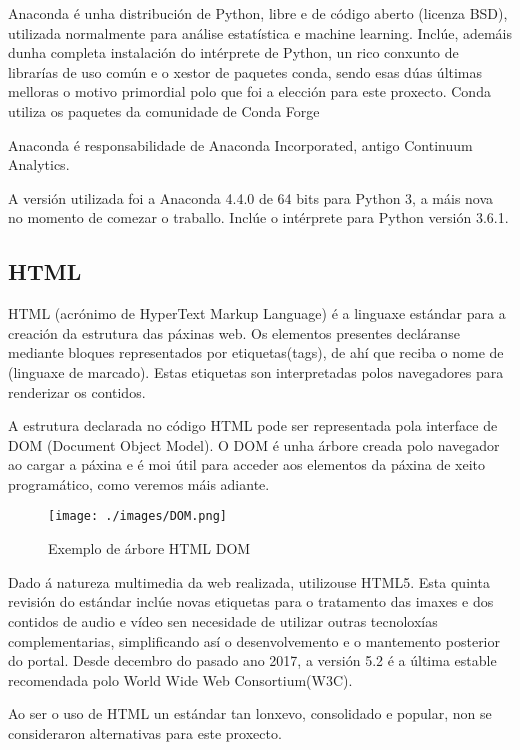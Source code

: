 Anaconda é unha distribución de Python, libre e de código aberto (licenza BSD), utilizada normalmente para análise estatística e machine learning. Inclúe, ademáis dunha completa instalación do intérprete de Python, un rico conxunto de librarías de uso común e o xestor de paquetes conda, sendo esas dúas últimas melloras o motivo primordial polo que foi a elección para este proxecto. Conda utiliza os paquetes da comunidade de Conda Forge \cite{anaconda1}

Anaconda é responsabilidade de Anaconda Incorporated, antigo Continuum Analytics.

A versión utilizada foi a Anaconda 4.4.0 de 64 bits para Python 3, a máis nova no momento de comezar o traballo. Inclúe o intérprete para Python versión 3.6.1.


\subsection{HTML}

HTML (acrónimo de HyperText Markup Language) é a linguaxe estándar para a creación da estrutura das páxinas web. Os 
elementos presentes decláranse mediante bloques representados por etiquetas(tags), de ahí que reciba o nome de
 (linguaxe de marcado). Estas etiquetas son interpretadas polos navegadores para renderizar os 
contidos\cite{html1}. 

A estrutura declarada no código HTML pode ser representada pola interface de DOM (Document Object Model). O DOM é unha árbore creada polo navegador ao cargar a páxina e é moi útil para acceder aos elementos da páxina de xeito programático, como veremos máis adiante.

\begin{figure}[H]
	\centering
	\texttt{[image: ./images/DOM.png]}
	\caption{Exemplo de árbore HTML DOM\protect\cite{dom}}
	\label{fig:img_DOM}
\end{figure}

Dado á natureza multimedia da web realizada, utilizouse HTML5. Esta quinta revisión do estándar inclúe novas etiquetas 
para o tratamento das imaxes e dos contidos de audio e vídeo sen necesidade de utilizar outras tecnoloxías complementarias, 
simplificando así o desenvolvemento e o mantemento posterior do portal. Desde decembro do pasado ano 2017, a versión 5.2 é a última estable recomendada polo World Wide Web Consortium(W3C)\cite{html_w3c}.

Ao ser o uso de HTML un estándar tan lonxevo, consolidado e popular, non se consideraron alternativas para este proxecto.


